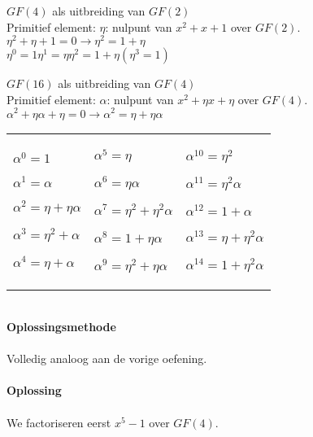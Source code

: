 \documentclass[11pt,a4paper,titlepage]{article}
\begin{document}
$GF(4)$ als uitbreiding van $GF(2)$\\
Primitief element: $\eta$: nulpunt van $x^2 + x + 1$ over $GF(2)$.\\
$\eta^2 + \eta + 1 = 0  \rightarrow  \eta^2 = 1 + \eta$\\
$\eta^0 = 1$\hspace{0.5cm}$\eta^1 = \eta$\hspace{0.5cm}$\eta^2 = 1 + \eta$\hspace{0.5cm}$(\eta^3 = 1)$

$GF(16)$ als uitbreiding van $GF(4)$\\
Primitief element: $\alpha$: nulpunt van $x^2 + \eta x + \eta$ over $GF(4)$.\\
$\alpha^2 + \eta \alpha + \eta = 0   \rightarrow  \alpha^2 = \eta + \eta \alpha$\\
\begin{tabularx}{\textwidth}{XXX}
$\alpha^{0} = 1$

$\alpha^{1} = \alpha$

$\alpha^{2} = \eta + \eta \alpha$

$\alpha^{3} = \eta^2 + \alpha$

$\alpha^{4} = \eta + \alpha$

&

$\alpha^{5} = \eta$

$\alpha^{6} = \eta \alpha$

$\alpha^{7} = \eta^2 + \eta^2 \alpha$

$\alpha^{8} = 1 + \eta \alpha$

$\alpha^{9} = \eta^2 + \eta \alpha$

&

$\alpha^{10} = \eta^2$

$\alpha^{11} = \eta^2 \alpha$

$\alpha^{12} = 1 + \alpha$

$\alpha^{13} = \eta + \eta^2 \alpha$

$\alpha^{14} = 1 + \eta^2 \alpha$
\end{tabularx}
\noindent \\ \textbf{Oplossingsmethode} \\ \\
	Volledig analoog aan de vorige oefening.
\\ \\ \textbf{Oplossing} \\ \\
	We factoriseren eerst $x^5-1$ over $GF(4)$.\\ \\
\end{document}
